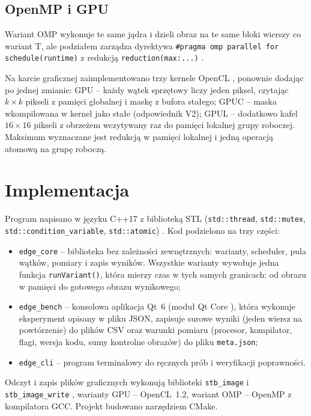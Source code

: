 \documentclass[12pt,a4paper]{article}
\newcommand{\kod}[1]{\texttt{#1}}
\begin{document}
\subsection{OpenMP i GPU}

Wariant OMP wykonuje te same jądra i dzieli obraz na te same bloki wierszy co wariant T, ale podziałem zarządza dyrektywa \kod{\#pragma omp parallel for schedule(runtime)} z redukcją \kod{reduction(max:...)} \cite{openmp}.

Na karcie graficznej zaimplementowano trzy kernele OpenCL \cite{opencl}, ponownie dodając po jednej zmianie: GPU -- każdy wątek sprzętowy liczy jeden piksel, czytając $k \times k$ pikseli z pamięci globalnej i maskę z bufora stałego; GPUC -- maska wkompilowana w kernel jako stałe (odpowiednik V2); GPUL -- dodatkowo kafel $16 \times 16$ pikseli z obrzeżem wczytywany raz do pamięci lokalnej grupy roboczej. Maksimum wyznaczane jest redukcją w pamięci lokalnej i jedną operacją atomową na grupę roboczą.

\section{Implementacja}

Program napisano w języku C++17 z biblioteką STL (\kod{std::thread}, \kod{std::mutex}, \kod{std::condition\_variable}, \kod{std::atomic}) \cite{williams,cppreference}. Kod podzielono na trzy części:
\begin{itemize}
	\item \kod{edge\_core} -- biblioteka bez zależności zewnętrznych: warianty, scheduler, pula wątków, pomiary i zapis wyników. Wszystkie warianty wywołuje jedna funkcja \kod{runVariant()}, która mierzy czas w tych samych granicach: od obrazu w pamięci do gotowego obrazu wynikowego;
	\item \kod{edge\_bench} -- konsolowa aplikacja Qt~6 (moduł Qt Core \cite{qt}), która wykonuje eksperyment opisany w pliku JSON, zapisuje surowe wyniki (jeden wiersz na powtórzenie) do plików CSV oraz warunki pomiaru (procesor, kompilator, flagi, wersja kodu, sumy kontrolne obrazów) do pliku \kod{meta.json};
	\item \kod{edge\_cli} -- program terminalowy do ręcznych prób i weryfikacji poprawności.
\end{itemize}
Odczyt i zapis plików graficznych wykonują biblioteki \kod{stb\_image} i \kod{stb\_image\_write} \cite{stb}, warianty GPU -- OpenCL~1.2, wariant OMP -- OpenMP z kompilatora GCC. Projekt budowano narzędziem CMake.
\end{document}
